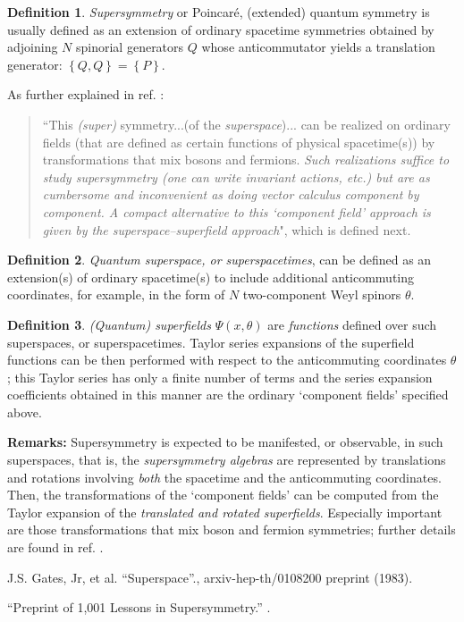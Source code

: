 \documentclass[12pt]{article}
\theoremstyle{plain}
\theoremstyle{definition}
\newtheorem{definition}{Definition}[section]
\numberwithin{equation}{section}
\begin{document}
\begin{definition}
\emph{Supersymmetry} or Poincar\'e, (extended) quantum symmetry is usually defined as an extension of ordinary spacetime symmetries obtained by adjoining $N$ spinorial generators $Q$ whose anticommutator yields a
translation generator: $\left\{Q ,Q \right\} = \left\{P\right\}$.
\end{definition}
 
As further explained in ref. \cite{JSG98}: 
\begin{quote}
``This \emph{(super)} symmetry...(of the \emph{superspace})... can be realized on ordinary fields (that are defined as certain functions of physical spacetime(s)) by transformations that mix bosons and fermions. 
\emph{Such realizations suffice to study supersymmetry (one can write invariant actions, etc.) but are as
cumbersome and inconvenient as doing vector calculus component by component. A compact alternative to this `component field' approach is given by the \emph{superspace--superfield} approach}", which is defined next.  
\end{quote}  

\begin{definition}
\emph{Quantum superspace, or superspacetimes}, can be defined as an extension(s) of ordinary spacetime(s) to include
additional anticommuting coordinates, for example, in the form of $N$ two-component Weyl spinors $\theta$.
\end{definition}

\begin{definition}
\emph{(Quantum) superfields} $\Psi(x , \theta)$ are \emph{functions} defined over such superspaces, or superspacetimes. 
Taylor series expansions of the superfield functions can be then performed with respect to the anticommuting coordinates $\theta$; this Taylor series has only a finite number of terms and the series expansion
coefficients obtained in this manner are the ordinary `component fields' specified above. 
\end{definition}

\textbf{Remarks:}
Supersymmetry is expected to be manifested, or observable, in such superspaces, that is, the  \emph{supersymmetry algebras} are represented by translations and rotations involving \emph{both} the spacetime and the anticommuting coordinates. Then, the transformations of the `component fields' can be computed from the Taylor expansion of
the \emph{translated and rotated superfields}. Especially important are those transformations that mix boson
and fermion symmetries; further details are found in ref. \cite{LS2k}.


\begin{thebibliography}{9}
J.S. Gates, Jr, et al. ``Superspace''.,  arxiv-hep-th/0108200 preprint (1983).

``Preprint of 1,001 Lessons in Supersymmetry.'' .

\end{thebibliography}
\end{document}

